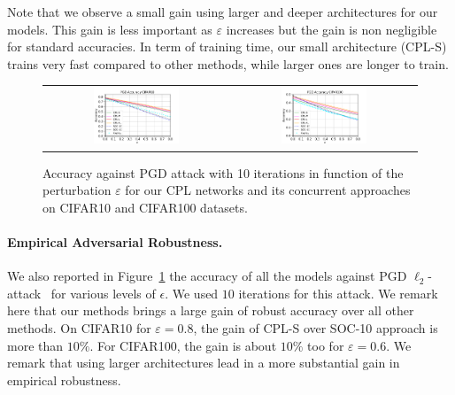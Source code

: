 Note that we observe a small gain using larger and deeper architectures for our models. This gain is less important as $\varepsilon$ increases but the gain is non negligible for standard accuracies. In term of training time, our small architecture (CPL-S) trains very fast compared to other methods, while larger ones are longer to train.


\begin{figure}[h]
    \centering
    \begin{tabular}{cc}
    \includegraphics[width =0.48\textwidth]{sections/4_certification/images/pgd_acc_eps_c10.pdf} & \includegraphics[width =0.48\textwidth]{sections/4_certification/images/pgd_acc_eps_c100.pdf}
    \end{tabular}
    \caption{Accuracy against PGD attack with 10 iterations in function of the perturbation $\varepsilon$ for our CPL networks and its concurrent approaches on CIFAR10 and CIFAR100 datasets.}
    \label{fig:pgd-acc}
\end{figure}
\paragraph{Empirical Adversarial Robustness.} We also reported in Figure~\ref{fig:pgd-acc} the accuracy of all the models against PGD $\ell_2$-attack~\citep{kurakin2016adversarial,madry2018towards} for various levels of $\epsilon$. We used $10$ iterations for this attack. We remark here that our methods brings a large gain of robust accuracy over all other methods. On CIFAR10 for $\varepsilon = 0.8$, the gain of CPL-S over SOC-10 approach is more than $10\%$. For CIFAR100, the gain is about $10\%$ too for $\varepsilon=0.6$. We remark that using larger architectures lead in a more substantial gain in empirical robustness. 

